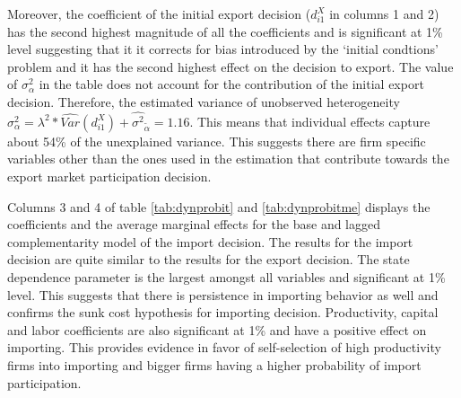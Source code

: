 \documentclass[12pt]{article}
\begin{document}
Moreover, the coefficient
 of the initial export decision ($d_{i1}^{X}$ in columns 1 and 2) has the second highest
     magnitude  of all the coefficients and  is significant at 1\% level
suggesting that it it corrects for bias introduced by the `initial
condtions' problem and it has the second highest effect on the
decision to export.
 The value of
  $\sigma^2_{\alpha}$ in the table does not account for the
  contribution of the initial export decision. Therefore, the estimated
  variance of 
  unobserved heterogeneity $\sigma^2_{\alpha}= \lambda^2 *
  \hat{Var}(d_{i1}^{X})+\hat{\sigma^2}_{\tilde{\alpha}}= 1.16$. This
  means that individual effects capture about 54\% of the unexplained
  variance. This suggests there are firm specific variables other than the ones used
  in the estimation that contribute towards the export market
  participation decision. 

 




 Columns 3 and 4 of table \ref{tab:dynprobit} and
  \ref{tab:dynprobitme} displays the coefficients and the average
  marginal effects for the base and lagged complementarity model of the
  import decision. The results for the import decision are quite similar to the
 results for the export decision. The state dependence parameter is the largest
  amongst all variables and
  significant at 1\% level. This suggests that there is  persistence in
  importing behavior as well and confirms the sunk cost hypothesis for
  importing decision. 
Productivity, capital and labor coefficients are also significant at 1\%
  and have a 
  positive effect on importing. This provides evidence in favor of
  self-selection of high productivity firms into importing and 
  bigger firms having a higher probability of import participation.  
\end{document}
